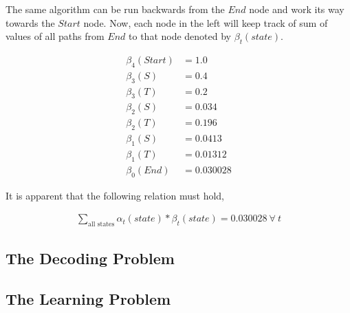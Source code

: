 \documentclass[11pt, a4paper]{article}
\begin{document}
The same algorithm can be run backwards from the $End$ node and work its way towards the $Start$ node. Now, each node in the left will keep track of sum of values of all paths from $End$ to that node denoted by $\beta_t(state)$.

\begin{align*}
	\beta_4(Start) & = 1.0      \\
	\beta_3(S)     & = 0.4      \\
	\beta_3(T)     & = 0.2      \\
	\beta_2(S)     & = 0.034    \\
	\beta_2(T)     & = 0.196    \\
	\beta_1(S)     & = 0.0413   \\
	\beta_1(T)     & = 0.01312  \\
	\beta_0(End)   & = 0.030028 
\end{align*}

It is apparent that the following relation must hold,

\begin{align*}
	\sum_{\text{all states}} \alpha_t(state)*\beta_t(state) = 0.030028\  \forall\ t 
\end{align*}
 
\subsection{The Decoding Problem}

\subsection{The Learning Problem}
\end{document}
